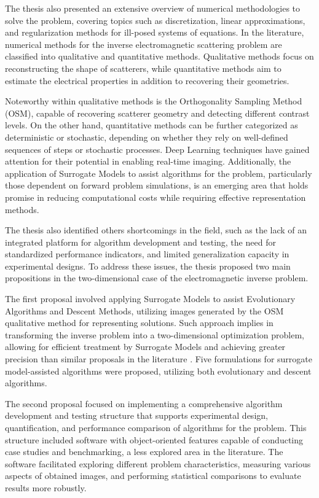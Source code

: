 		The thesis also presented an extensive overview of numerical methodologies to solve the problem, covering topics such as discretization, linear approximations, and regularization methods for ill-posed systems of equations. In the literature, numerical methods for the inverse electromagnetic scattering problem are classified into qualitative and quantitative methods. Qualitative methods focus on reconstructing the shape of scatterers, while quantitative methods aim to estimate the electrical properties in addition to recovering their geometries.
		
		Noteworthy within qualitative methods is the Orthogonality Sampling Method (OSM), capable of recovering scatterer geometry and detecting different contrast levels. On the other hand, quantitative methods can be further categorized as deterministic or stochastic, depending on whether they rely on well-defined sequences of steps or stochastic processes. Deep Learning techniques have gained attention for their potential in enabling real-time imaging. Additionally, the application of Surrogate Models to assist algorithms for the problem, particularly those dependent on forward problem simulations, is an emerging area that holds promise in reducing computational costs while requiring effective representation methods.
		
		The thesis also identified others shortcomings in the field, such as the lack of an integrated platform for algorithm development and testing, the need for standardized performance indicators, and limited generalization capacity in experimental designs. To address these issues, the thesis proposed two main propositions in the two-dimensional case of the electromagnetic inverse problem.
		
		The first proposal involved applying Surrogate Models to assist Evolutionary Algorithms and Descent Methods, utilizing images generated by the OSM qualitative method for representing solutions. Such approach implies in transforming the inverse problem into a two-dimensional optimization problem, allowing for efficient treatment by Surrogate Models and achieving greater precision than similar proposals in the literature \citep{salucci2022learned}. Five formulations for surrogate model-assisted algorithms were proposed, utilizing both evolutionary and descent algorithms.
		
		The second proposal focused on implementing a comprehensive algorithm development and testing structure that supports experimental design, quantification, and performance comparison of algorithms for the problem. This structure included software with object-oriented features capable of conducting case studies and benchmarking, a less explored area in the literature. The software facilitated exploring different problem characteristics, measuring various aspects of obtained images, and performing statistical comparisons to evaluate results more robustly.
		
